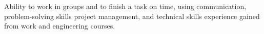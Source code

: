 


\begin{cvparagraph}


{Ability to work in groups and to finish a task on time, using communication, problem-solving skills project management, and technical skills experience gained from work and engineering courses.}

\end{cvparagraph}
\vspace{-4mm}